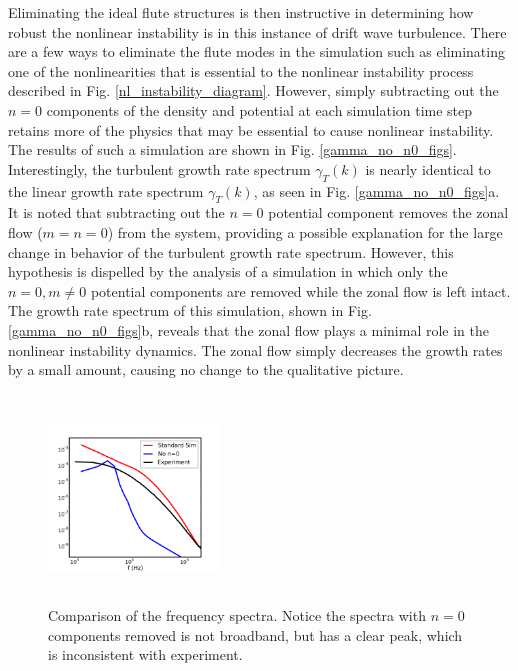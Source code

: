 \documentclass[twocolumn,showpacs,preprintnumbers,amsmath,amssymb]{revtex4}
\begin{document}
Eliminating the ideal flute structures is then instructive
in determining how robust the nonlinear instability is in this instance of drift wave turbulence. There are a few ways to eliminate the flute modes in the simulation such as
eliminating one of the nonlinearities that is essential to the nonlinear instability process described in Fig. \ref{nl_instability_diagram}. However, simply subtracting out the $n=0$
components of the density and potential at each simulation time step retains more of the physics that may be essential to cause nonlinear instability. The results of such a simulation
are shown in Fig. \ref{gamma_no_n0_figs}. Interestingly, the turbulent growth rate spectrum $\gamma_T(k)$ is nearly identical to the linear growth rate spectrum $\gamma_T(k)$, as seen in
Fig. \ref{gamma_no_n0_figs}a. It is noted that subtracting out the $n=0$ potential component removes the zonal flow ($m=n=0$) from the system, providing a possible explanation for the large change
in behavior of the turbulent growth rate spectrum. However, this hypothesis is dispelled by the analysis of a simulation in which only the $n=0, m \ne 0$ potential components are removed while 
the zonal flow is left intact. The growth rate spectrum of this simulation, shown in Fig. \ref{gamma_no_n0_figs}b, reveals that the zonal flow plays a minimal role in the nonlinear instability
dynamics. The zonal flow simply decreases the growth rates by a small amount, causing no change to the qualitative picture. 

\begin{figure}
\includegraphics[width=0.40\textwidth,height=55mm]{fspec_3}
\hfil
\caption{Comparison of the frequency spectra. Notice the spectra with $n=0$ components removed is not broadband, but has a clear peak, which is inconsistent with experiment.}
\label{freq_spectra3}
\end{figure}
\end{document}
